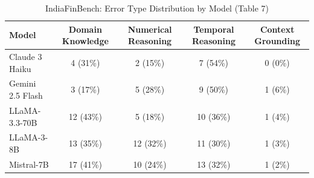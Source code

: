 \begin{table}[h]
\centering
\small
\caption{IndiaFinBench: Error Type Distribution by Model (Table 7)}
\label{tab:error_distribution}
\begin{tabular}{lcccc}
\toprule
Model & \textbf{Domain Knowledge} & \textbf{Numerical Reasoning} & \textbf{Temporal Reasoning} & \textbf{Context Grounding} \\
\midrule
Claude 3 Haiku & 4 (31\%) & 2 (15\%) & 7 (54\%) & 0 (0\%) \\
Gemini 2.5 Flash & 3 (17\%) & 5 (28\%) & 9 (50\%) & 1 (6\%) \\
LLaMA-3.3-70B & 12 (43\%) & 5 (18\%) & 10 (36\%) & 1 (4\%) \\
LLaMA-3-8B & 13 (35\%) & 12 (32\%) & 11 (30\%) & 1 (3\%) \\
Mistral-7B & 17 (41\%) & 10 (24\%) & 13 (32\%) & 1 (2\%) \\
\bottomrule
\end{tabular}
\end{table}
